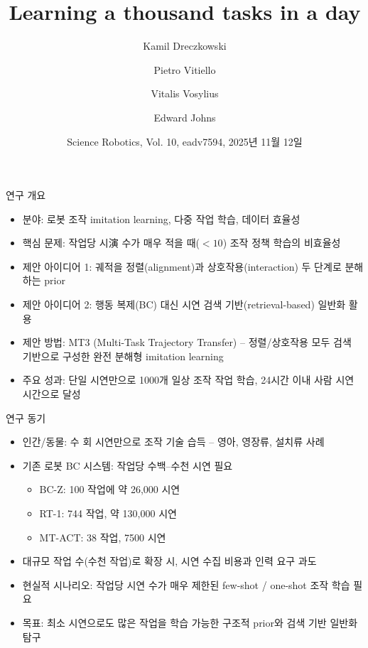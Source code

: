 \documentclass[aspectratio=169]{beamer}
\title[Learning a thousand tasks in a day]{Learning a thousand tasks in a day}
\author[K. Dreczkowski et al.]{
Kamil Dreczkowski \and Pietro Vitiello \and Vitalis Vosylius \and Edward Johns
}
\institute[Imperial College London]{
Robot Learning Lab\\
Imperial College London
}
\date[Sci. Robotics 2025]{Science Robotics, Vol. 10, eadv7594, 2025년 11월 12일}
\begin{document}
\begin{frame}
  \titlepage
\end{frame}

\begin{frame}{연구 개요}
  \small
  \begin{itemize}
    \item 분야: 로봇 조작 imitation learning, 다중 작업 학습, 데이터 효율성
    \item 핵심 문제: 작업당 시演 수가 매우 적을 때($<10$) 조작 정책 학습의 비효율성
    \item 제안 아이디어 1: 궤적을 정렬(alignment)과 상호작용(interaction) 두 단계로 분해하는 prior
    \item 제안 아이디어 2: 행동 복제(BC) 대신 시연 검색 기반(retrieval-based) 일반화 활용
    \item 제안 방법: MT3 (Multi-Task Trajectory Transfer) – 정렬/상호작용 모두 검색 기반으로 구성한 완전 분해형 imitation learning
    \item 주요 성과: 단일 시연만으로 1000개 일상 조작 작업 학습, 24시간 이내 사람 시연 시간으로 달성
  \end{itemize}
\end{frame}

\begin{frame}{연구 동기}
  \small
  \begin{itemize}
    \item 인간/동물: 수 회 시연만으로 조작 기술 습득 – 영아, 영장류, 설치류 사례
    \item 기존 로봇 BC 시스템: 작업당 수백–수천 시연 필요
    \begin{itemize}
      \item BC-Z: 100 작업에 약 26,000 시연
      \item RT-1: 744 작업, 약 130,000 시연
      \item MT-ACT: 38 작업, 7500 시연
    \end{itemize}
    \item 대규모 작업 수(수천 작업)로 확장 시, 시연 수집 비용과 인력 요구 과도
    \item 현실적 시나리오: 작업당 시연 수가 매우 제한된 few-shot / one-shot 조작 학습 필요
    \item 목표: 최소 시연으로도 많은 작업을 학습 가능한 구조적 prior와 검색 기반 일반화 탐구
  \end{itemize}
\end{frame}
\end{document}
